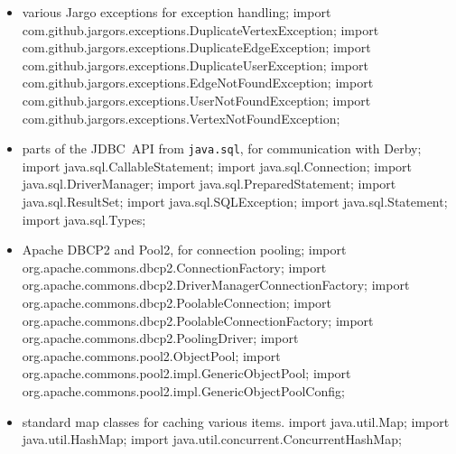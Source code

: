 \documentclass{article}
\def\nwendcode{\endtrivlist \endgroup}      %
\let\nwdocspar=\par
\theoremstyle{definition}                   %
\begin{document}
\begin{itemize}
\item various Jargo exceptions for exception handling;
\nwenddocs{}\plusendmoddef
import com.github.jargors.exceptions.DuplicateVertexException;
import com.github.jargors.exceptions.DuplicateEdgeException;
import com.github.jargors.exceptions.DuplicateUserException;
import com.github.jargors.exceptions.EdgeNotFoundException;
import com.github.jargors.exceptions.UserNotFoundException;
import com.github.jargors.exceptions.VertexNotFoundException;
\nwendcode{}\item parts of the JDBC~API from {\tt{}java.sql}, for communication with Derby;
\nwenddocs{}\plusendmoddef
import java.sql.CallableStatement;   import java.sql.Connection;
import java.sql.DriverManager;       import java.sql.PreparedStatement;
import java.sql.ResultSet;           import java.sql.SQLException;
import java.sql.Statement;           import java.sql.Types;
\nwendcode{}\item Apache DBCP2 and Pool2, for connection pooling;
\nwenddocs{}\plusendmoddef
import org.apache.commons.dbcp2.ConnectionFactory;
import org.apache.commons.dbcp2.DriverManagerConnectionFactory;
import org.apache.commons.dbcp2.PoolableConnection;
import org.apache.commons.dbcp2.PoolableConnectionFactory;
import org.apache.commons.dbcp2.PoolingDriver;
import org.apache.commons.pool2.ObjectPool;
import org.apache.commons.pool2.impl.GenericObjectPool;
import org.apache.commons.pool2.impl.GenericObjectPoolConfig;
\nwendcode{}\item standard map classes for caching various items.
\nwenddocs{}\plusendmoddef
import java.util.Map;
import java.util.HashMap;
import java.util.concurrent.ConcurrentHashMap;
\nwendcode{}\nwdocspar
\end{itemize}
\end{document}
